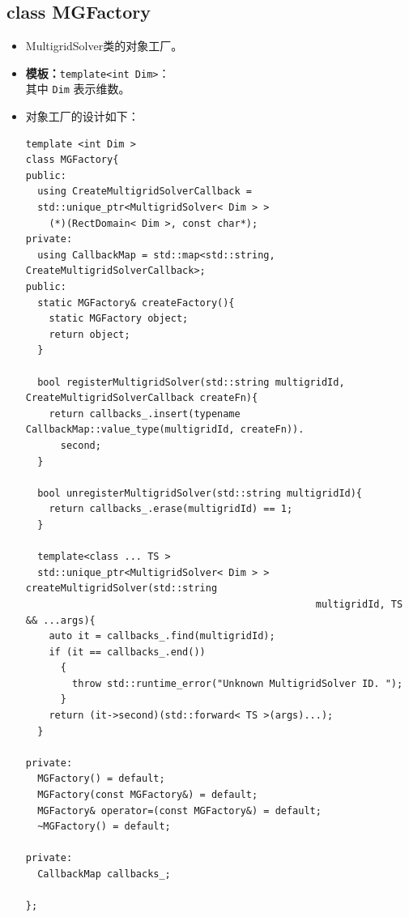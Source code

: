 \documentclass[a4paper,twoside]{ctexart}
\begin{document}
\subsection*{class MGFactory}
\begin{itemize}
    \item MultigridSolver类的对象工厂。
    \item \textbf{模板：}\texttt{template<int Dim>}：\\
      其中 \texttt{Dim} 表示维数。
    \item 对象工厂的设计如下：
      \scriptsize
  \begin{lstlisting}
template <int Dim >
class MGFactory{
public:
  using CreateMultigridSolverCallback =
  std::unique_ptr<MultigridSolver< Dim > >
    (*)(RectDomain< Dim >, const char*);
private:
  using CallbackMap = std::map<std::string, CreateMultigridSolverCallback>;
public:
  static MGFactory& createFactory(){
    static MGFactory object;
    return object;
  }

  bool registerMultigridSolver(std::string multigridId, CreateMultigridSolverCallback createFn){
    return callbacks_.insert(typename CallbackMap::value_type(multigridId, createFn)).
      second;
  }

  bool unregisterMultigridSolver(std::string multigridId){
    return callbacks_.erase(multigridId) == 1;
  }

  template<class ... TS >
  std::unique_ptr<MultigridSolver< Dim > > createMultigridSolver(std::string
                                                  multigridId, TS && ...args){
    auto it = callbacks_.find(multigridId);
    if (it == callbacks_.end())
      {
        throw std::runtime_error("Unknown MultigridSolver ID. ");
      }
    return (it->second)(std::forward< TS >(args)...);
  }

private:
  MGFactory() = default;
  MGFactory(const MGFactory&) = default;
  MGFactory& operator=(const MGFactory&) = default;
  ~MGFactory() = default;
  
private:
  CallbackMap callbacks_;
  
};
  \end{lstlisting}


         
          
       
\end{itemize}
\end{document}
